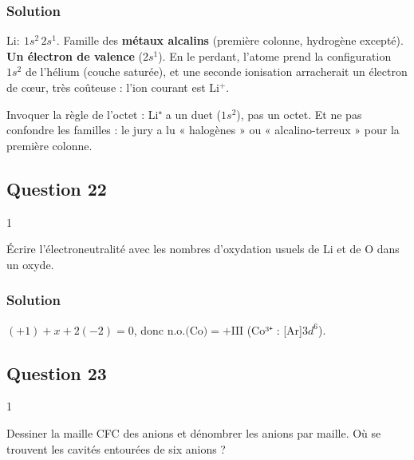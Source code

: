 \documentclass[11pt,a4paper]{article}
\begin{document}
\hypertarget{solution-20}{%
\subsubsection{Solution}\label{solution-20}}

\(\mathrm{Li}:\ 1s^2\,2s^1\). Famille des \textbf{métaux alcalins} (première colonne, hydrogène excepté). \textbf{Un électron de valence} (\(2s^1\)). En le perdant, l'atome prend la configuration \(1s^2\) de l'hélium (couche saturée), et une seconde ionisation arracherait un électron de cœur, très coûteuse : l'ion courant est \(\boxed{\mathrm{Li^+}}\).

\begin{piege}

Invoquer la règle de l'octet : Li⁺ a un duet (\(1s^2\)), pas un octet. Et ne pas confondre les familles : le jury a lu « halogènes » ou « alcalino-terreux » pour la première colonne.

\end{piege}

\hypertarget{question-22}{%
\subsection{Question 22}\label{question-22}}

\begin{indication}{1}

Écrire l'électroneutralité avec les nombres d'oxydation usuels de Li et de O dans un oxyde.

\end{indication}

\hypertarget{solution-21}{%
\subsubsection{Solution}\label{solution-21}}

\((+1)+x+2(-2)=0\), donc \(\boxed{\text{n.o.(Co)}=+\mathrm{III}}\) (Co³⁺ : {[}Ar{]}\(3d^6\)).

\hypertarget{question-23}{%
\subsection{Question 23}\label{question-23}}

\begin{indication}{1}

Dessiner la maille CFC des anions et dénombrer les anions par maille. Où se trouvent les cavités entourées de six anions ?

\end{indication}
\end{document}
